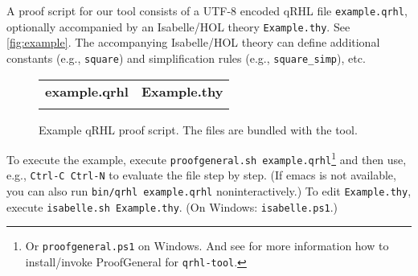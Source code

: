 \documentclass{article}
\begin{document}
A proof script for our tool consists of a UTF-8 encoded qRHL file
\texttt{example.qrhl}, optionally accompanied by an Isabelle/HOL
theory \texttt{Example.thy}. See \autoref{fig:example}. The
accompanying Isabelle/HOL theory can define additional constants
(e.g., \texttt{square}) and simplification rules (e.g.,
\texttt{square\_simp}), etc.  

\begin{figure}[t]\centering
  \lstset{aboveskip=0pt,belowskip=0pt,frame=single}
  \centering
  \begin{tabular}{p{.45\hsize}p{.45\hsize}}
    \textbf{example.qrhl}
    &
      \textbf{Example.thy}
    \\[-5pt]
    
    &
      
  \end{tabular}
  \vspace*{-5mm}
  \caption{Example qRHL proof script. The files are bundled with the tool.}
  \label{fig:example}
\end{figure}

To execute the example, execute \texttt{proofgeneral.sh
  example.qrhl}\footnote{Or \texttt{proofgeneral.ps1} on Windows.
  And see \cite{proofgeneral-config} for more information how to install/invoke ProofGeneral for \texttt{qrhl-tool}.}
  and then use, e.g., \texttt{Ctrl-C Ctrl-N} to evaluate
the file step by step. (If emacs is not available, you can also run
\texttt{bin/qrhl example.qrhl} noninteractively.) To edit
\texttt{Example.thy}, execute \texttt{isabelle.sh Example.thy}.
(On Windows: \texttt{isabelle.ps1}.)
\end{document}
